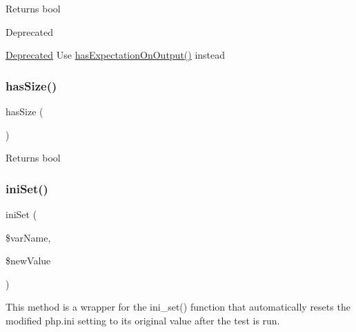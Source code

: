 \begin{DoxyReturn}{Returns}
bool
\end{DoxyReturn}
\begin{DoxyRefDesc}{Deprecated}
\item[\mbox{\hyperlink{deprecated__deprecated000027}{Deprecated}}]Use \mbox{\hyperlink{class_p_h_p_unit___framework___test_case_a74eb482ac0921b7c5069cf3d8c00f033}{has\+Expectation\+On\+Output()}} instead \end{DoxyRefDesc}
\mbox{\label{class_p_h_p_unit___framework___test_case_a994c9977f1ee4789d8e5665b49421c6b}} 
\subsubsection{\texorpdfstring{has\+Size()}{hasSize()}}
{\footnotesize\ttfamily has\+Size (\begin{DoxyParamCaption}{ }\end{DoxyParamCaption})}

\begin{DoxyReturn}{Returns}
bool 
\end{DoxyReturn}
\mbox{\label{class_p_h_p_unit___framework___test_case_a82d7151b3bd880686e79a66c5baa583d}} 
\subsubsection{\texorpdfstring{ini\+Set()}{iniSet()}}
{\footnotesize\ttfamily ini\+Set (\begin{DoxyParamCaption}\item[{}]{\$var\+Name,  }\item[{}]{\$new\+Value }\end{DoxyParamCaption})\hspace{0.3cm}{\ttfamily [protected]}}

This method is a wrapper for the ini\+\_\+set() function that automatically resets the modified php.\+ini setting to its original value after the test is run.


